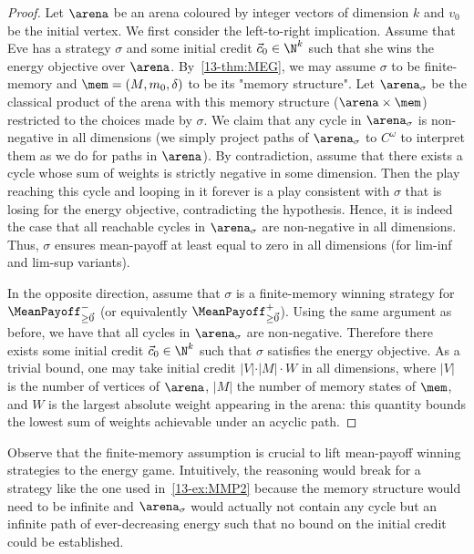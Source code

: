 \begin{proof}
Let $\arena$ be an arena coloured by integer vectors of dimension $k$ and $v_0$ be the initial vertex. We first consider the left-to-right implication. Assume that Eve has a strategy $\sigma$ and some initial credit $\vec{c}_0 \in \N^k$ such that she wins the energy objective over $\arena$. By~\cref{13-thm:MEG}, we may assume $\sigma$ to be finite-memory and $\mem = (M, m_0, \delta)$ to be its "memory structure". Let $\arena_\sigma$ be the classical product of the arena with this memory structure ($\arena \times \mem$) restricted to the choices made by $\sigma$. We claim that any cycle in $\arena_\sigma$ is non-negative in all dimensions (we simply project paths of $\arena_\sigma$ to $C^\omega$ to interpret them as we do for paths in $\arena$). By contradiction, assume that there exists a cycle whose sum of weights is strictly negative in some dimension. Then the play reaching this cycle and looping in it forever is a play consistent with $\sigma$ that is losing for the energy objective, contradicting the hypothesis. Hence, it is indeed the case that all reachable cycles in $\arena_\sigma$ are non-negative in all dimensions. Thus, $\sigma$ ensures mean-payoff at least equal to zero in all dimensions (for lim-inf and lim-sup variants).

In the opposite direction, assume that $\sigma$ is a finite-memory winning strategy for $\MeanPayoff^{-}_{\geq \vec{0}}$ (or equivalently $\MeanPayoff^{+}_{\geq \vec{0}}$). Using the same argument as before, we have that all cycles in $\arena_\sigma$ are non-negative. Therefore there exists some initial credit $\vec{c}_0 \in \N^k$ such that $\sigma$ satisfies the energy objective. As a trivial bound, one may take initial credit $\vert V\vert \cdot \vert M \vert \cdot W$ in all dimensions, where $\vert V\vert$ is the number of vertices of $\arena$, $\vert M \vert$ the number of memory states of $\mem$, and $W$ is the largest absolute weight appearing in the arena: this quantity bounds the lowest sum of weights achievable under an acyclic path.
\end{proof}

Observe that the finite-memory assumption is crucial to lift mean-payoff winning strategies to the energy game. Intuitively, the reasoning would break for a strategy like the one used in~\cref{13-ex:MMP2} because the memory structure would need to be infinite and $\arena_\sigma$ would actually not contain any cycle but an infinite path of ever-decreasing energy such that no bound on the initial credit could be established.


